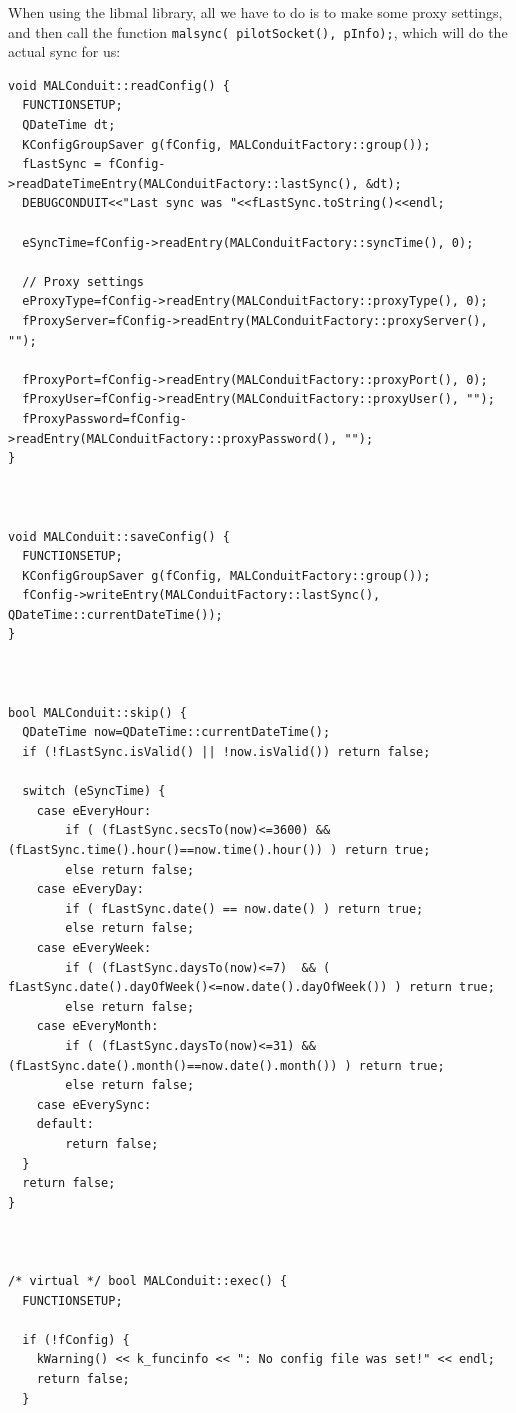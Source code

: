 \documentclass[10pt,a4paper]{article}
\begin{document}
When using the libmal library, all we have to do is to make some proxy settings, and then call the function \texttt{malsync( pilotSocket(), pInfo);}, which will do the actual sync for us:
{\footnotesize
\begin{verbatim}
void MALConduit::readConfig() {
  FUNCTIONSETUP;
  QDateTime dt;
  KConfigGroupSaver g(fConfig, MALConduitFactory::group());
  fLastSync = fConfig->readDateTimeEntry(MALConduitFactory::lastSync(), &dt);
  DEBUGCONDUIT<<"Last sync was "<<fLastSync.toString()<<endl;

  eSyncTime=fConfig->readEntry(MALConduitFactory::syncTime(), 0);
  
  // Proxy settings
  eProxyType=fConfig->readEntry(MALConduitFactory::proxyType(), 0);
  fProxyServer=fConfig->readEntry(MALConduitFactory::proxyServer(), "");

  fProxyPort=fConfig->readEntry(MALConduitFactory::proxyPort(), 0);
  fProxyUser=fConfig->readEntry(MALConduitFactory::proxyUser(), "");
  fProxyPassword=fConfig->readEntry(MALConduitFactory::proxyPassword(), "");
}



void MALConduit::saveConfig() {
  FUNCTIONSETUP;
  KConfigGroupSaver g(fConfig, MALConduitFactory::group());
  fConfig->writeEntry(MALConduitFactory::lastSync(), QDateTime::currentDateTime());
}



bool MALConduit::skip() {
  QDateTime now=QDateTime::currentDateTime();
  if (!fLastSync.isValid() || !now.isValid()) return false;

  switch (eSyncTime) {
    case eEveryHour:
        if ( (fLastSync.secsTo(now)<=3600) && (fLastSync.time().hour()==now.time().hour()) ) return true;
        else return false;
    case eEveryDay:
        if ( fLastSync.date() == now.date() ) return true;
        else return false;
    case eEveryWeek:
        if ( (fLastSync.daysTo(now)<=7)  && ( fLastSync.date().dayOfWeek()<=now.date().dayOfWeek()) ) return true;
        else return false;
    case eEveryMonth:
        if ( (fLastSync.daysTo(now)<=31) && (fLastSync.date().month()==now.date().month()) ) return true;
        else return false;
    case eEverySync:
    default:
        return false;
  }
  return false;
}



/* virtual */ bool MALConduit::exec() {
  FUNCTIONSETUP;

  if (!fConfig) {
    kWarning() << k_funcinfo << ": No config file was set!" << endl;
    return false;
  }


\end{verbatim}}
\end{document}
